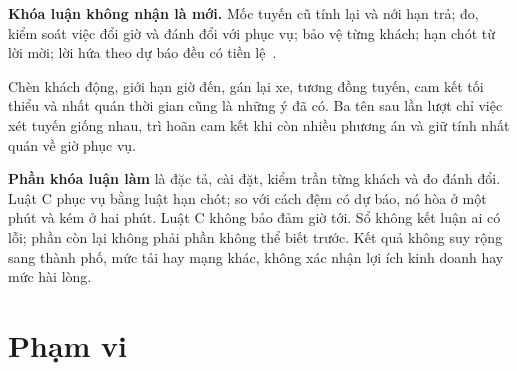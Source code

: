 \begin{khungy}
\textbf{Khóa luận không nhận là mới.} Mốc tuyến cũ tính lại và nới hạn trả; đo, kiểm soát việc đổi giờ và
đánh đổi với phục vụ; bảo vệ từng khách; hạn chót từ lời mời; lời hứa theo dự báo đều có
tiền lệ~\cite{horl2022,fielbaum2020,elmi2026,schulz2026,hu2022}.

Chèn khách động, giới hạn giờ đến, gán lại xe, tương đồng tuyến, cam kết tối thiểu và nhất quán thời gian
cũng là những ý đã có. Ba tên sau lần lượt chỉ việc xét tuyến giống nhau, trì hoãn cam kết
khi còn nhiều phương án và giữ tính nhất quán về giờ phục vụ.

\textbf{Phần khóa luận làm} là đặc tả, cài đặt, kiểm trần từng khách và đo đánh đổi. Luật C phục vụ bằng
luật hạn chót; so với cách đệm có dự báo, nó hòa ở một phút và kém ở hai phút. Luật C không bảo đảm giờ tới.
Sổ không kết luận ai có lỗi; phần còn lại không phải phần không thể biết trước. Kết quả không suy rộng
sang thành phố, mức tải hay mạng khác, không xác nhận lợi ích kinh doanh hay mức hài lòng.
\end{khungy}

\section{Phạm vi}
\label{muc:c1-phamvi}

